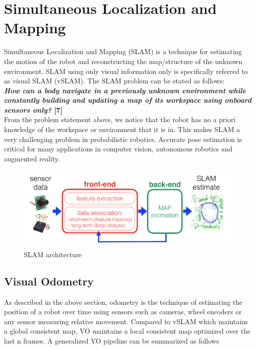 \section{Simultaneous Localization and Mapping}
\label{slam}

Simultaneous Localization and Mapping (SLAM) is a technique for estimating the motion of the robot and reconstructing the map/structure of the unknown environment. SLAM using only visual information only is specifically referred to as visual SLAM (vSLAM). The SLAM problem can be stated as follows:\\

\textbf{\emph{How can a body navigate in a previously unknown environment while constantly building and updating a map of its workspace using onboard sensors only?} [7]}\\

From the problem statement above, we notice that the robot has no a priori knowledge of the workspace or environment that it is in. This makes SLAM a very challenging problem in probabilistic robotics. Accurate pose estimation is critical for many applications in computer vision, autonomous robotics and augmented reality.
  

\begin{figure}
  \includegraphics[width=\textwidth]{./figures/slam_model.png}
\caption{SLAM architecture}
\label{fig:slammodel}       %
\end{figure}

\subsection{Visual Odometry}

As described in the above section, odometry is the technique of estimating the position of a robot over time using sensors such as cameras,  wheel encoders or any sensor measuring relative movement. Compared to vSLAM which maintains a global consistent map, VO maintains a local consistent map optimized over the last n frames. A generalized VO pipeline can be summarized as follows

